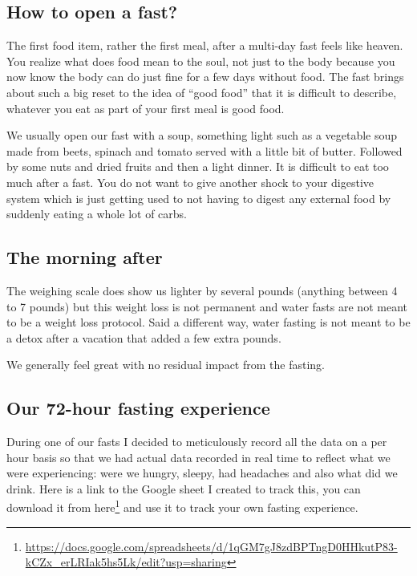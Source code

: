 \documentclass[
  oneside]{book}
\DeclareRobustCommand{\href}[2]{#2\footnote{\url{#1}}}
\begin{document}
\hypertarget{how-to-open-a-fast}{%
\subsection{How to open a fast?}\label{how-to-open-a-fast}}

The first food item, rather the first meal, after a multi-day fast feels like heaven. You realize what does food mean to the soul, not just to the body because you now know the body can do just fine for a few days without food. The fast brings about such a big reset to the idea of ``good food'' that it is difficult to describe, whatever you eat as part of your first meal is good food.

We usually open our fast with a soup, something light such as a vegetable soup made from beets, spinach and tomato served with a little bit of butter. Followed by some nuts and dried fruits and then a light dinner. It is difficult to eat too much after a fast. You do not want to give another shock to your digestive system which is just getting used to not having to digest any external food by suddenly eating a whole lot of carbs.

\hypertarget{the-morning-after}{%
\subsection{The morning after}\label{the-morning-after}}

The weighing scale does show us lighter by several pounds (anything between 4 to 7 pounds) but this weight loss is not permanent and water fasts are not meant to be a weight loss protocol. Said a different way, water fasting is not meant to be a detox after a vacation that added a few extra pounds.

We generally feel great with no residual impact from the fasting.

\hypertarget{our-72-hour-fasting-experience}{%
\subsection{Our 72-hour fasting experience}\label{our-72-hour-fasting-experience}}

During one of our fasts I decided to meticulously record all the data on a per hour basis so that we had actual data recorded in real time to reflect what we were experiencing: were we hungry, sleepy, had headaches and also what did we drink. Here is a link to the Google sheet I created to track this, you can download it \href{https://docs.google.com/spreadsheets/d/1qGM7gJ8zdBPTngD0HHkutP83-kCZx_erLRIak5hs5Lk/edit?usp=sharing}{from here} and use it to track your own fasting experience.
\end{document}
